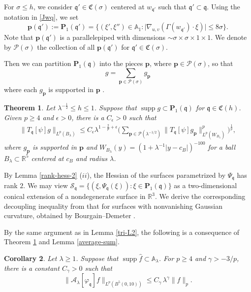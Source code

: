 \documentclass[10pt] %
{amsart}
\theoremstyle{plain}
\newtheorem{thm}{Theorem}[section]
\newtheorem{cor}[thm]{Corollary}
\numberwithin{equation}{section}
\newcommand{\R}{\mathbb R}
\DeclareMathOperator{\supp}{supp}
\newcommand{\fq}{\mathfrak q}
\newcommand{\fm}{\mathfrak{q'}}
\begin{document}
For $\sigma \le h$, we consider $\fm \in \mathfrak C(\sigma)$ centered at $w_\fm$ such that $\fm \subset \fq$. 
Using the notation in \eqref{Jwq}, we set 
\begin{equation}\label{set of plank}
\mathbf p(\fm) :=  \mathbf P_1(\fm) = \big\{(\xi',\xi'') \in \mathbb A_1: 
\big|\nabla_{u,v}(\Gamma(w_\fm)\cdot \xi ) \big| \le 8 \sigma \big\} .
\end{equation}
Note that $\mathbf p(\fm)$ is a parallelepiped with dimensions $\sim\sigma \times \sigma \times 1 \times 1$. 
We denote by $\mathcal P(\sigma)$ the collection of all  $\mathbf p(\fm)$ for $\fm \in \mathfrak C(\sigma)$.

Then we can partition $\mathbf P_1(\fq)$ into the pieces $\mathbf p$, where $\mathbf p \in \mathcal P(\sigma)$,  so that
\[ 
g = \sum_{\mathbf p \in \mathcal P(\sigma)} g_{\mathbf p}
\] 
where each  $ g_{\mathbf p} $ is supported in $\mathbf p$ .



\begin{thm}\label{extension decoupling}
Let  $\lambda^{-\frac12} \le h \le  1 $. 
Suppose that $\supp   g \subset \mathbf P_1(\fq)$ for $\fq \in \mathfrak C(h)$. 
Given $p\ge4$ and $\epsilon>0$, there is a $C_\epsilon>0$ such that
\begin{align}\label{extension decoupling norm}
\big\|    T_{\fq}[\psi] g \big\|_{L^p(B_\lambda)} \le C_\epsilon \lambda^{1-\frac2p+\epsilon}\Big( \sum_{\mathbf p \in \mathcal P(\lambda^{-1/2})} \big\|  T_{\fq}[\psi] g_{\mathbf p } \big\|_{L^p(W_{B_\lambda})}^p \Big)^{\frac 1p} ,
\end{align}
where $ {g_{\mathbf p}}$ is supported in $\mathbf p$ and $W_{B_\lambda}(y) = (1+ \lambda^{-1}|y-c_B|)^{-100}$ for a ball $B_\lambda \subset \mathbb R^5$ centered at $c_B$ and radius $\lambda$. 
\end{thm}

By Lemma \ref{rank-hess-2} ($ii$), the Hessian of the surfaces parametrized by $\Psi_\fq$ has rank $2$. 
We may view $\mathcal S_\fq = \{(\xi, \Psi_\fq(\xi)): \xi \in \mathbf P_1(\fq)\}$ as a two-dimensional conical extension of a nondegenerate surface in $\R^3$.
We derive the corresponding decoupling inequality from that for surfaces with nonvanishing Gaussian curvature, obtained by Bourgain--Demeter \cite{BD0, BD}.  

By the same argument as in Lemma \ref{tri-L2}, the following is a consequence of Theorem \ref{extension decoupling} and Lemma \ref{average-sum}. 
\begin{cor}\label{cor:dec4} 
Let  $\lambda \ge1$. Suppose that $\supp\widehat f \subset \mathbb A_\lambda$. For $ p \ge 4 $ and $\gamma > -3/p$, there is a constant $C_\gamma >0$ such that
\begin{equation}\label{dec4}
\|  \mathcal A_\lambda [\varphi_{\fq }] f \|_{L^p(B^5(0,10))}
\le C_\gamma \,\lambda^\gamma  \|f \|_p.
\end{equation}
\end{cor}
\end{document}
